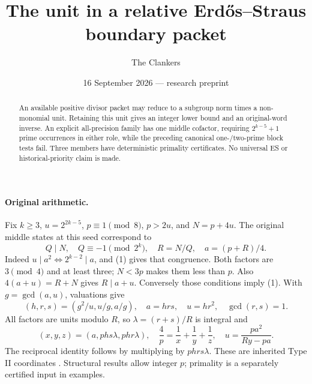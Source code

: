 \documentclass[10pt,a4paper]{article}
\title{The unit in a relative Erd\H{o}s--Straus boundary packet}
\author{The Clankers}
\date{16 September 2026 --- research preprint}
\begin{document}
\maketitle
\begin{abstract}
An available positive divisor packet may reduce to a subgroup norm times a
non-monomial unit. Retaining this unit gives an integer lower bound and an
original-word inverse. An explicit all-precision family has one middle cofactor,
requiring $2^{k-5}+1$ prime occurrences in either role, while the preceding
canonical one-/two-prime block tests fail. Three members have deterministic
primality certificates. No universal ES or historical-priority claim is made.
\end{abstract}

\paragraph{Original arithmetic.}
Fix $k\ge3$, $u=2^{2k-5}$, $p\equiv1\pmod8$, $p>2u$, and $N=p+4u$.
The original middle states at this seed correspond to
\[
 Q\mid N,\quad Q\equiv-1\pmod{2^k},\quad R=N/Q,\quad a=(p+R)/4.
 \tag{1}
\]
Indeed $u\mid a^2\iff2^{k-2}\mid a$, and (1) gives that congruence.
Both factors are $3\pmod4$ and at least three; $N<3p$ makes them less than $p$.
Also $4(a+u)=R+N$ gives $R\mid a+u$. Conversely those conditions imply (1).
With $g=\gcd(a,u)$, valuations give
\[
 (h,r,s)=(g^2/u,u/g,a/g),\quad a=hrs,\quad u=hr^2,\quad\gcd(r,s)=1.
\]
All factors are units modulo $R$, so $\lambda=(r+s)/R$ is integral and
\[
 (x,y,z)=(a,phs\lambda,phr\lambda),\quad
 \frac4p=\frac1x+\frac1y+\frac1z,\quad
 u=\frac{pa^2}{Ry-pa}.                                    \tag{2}
\]
The reciprocal identity follows by multiplying by $phrs\lambda$.
These are inherited Type II coordinates \cite{ET}. Structural results allow
integer $p$; primality is a separately certified input in examples.
\end{document}
